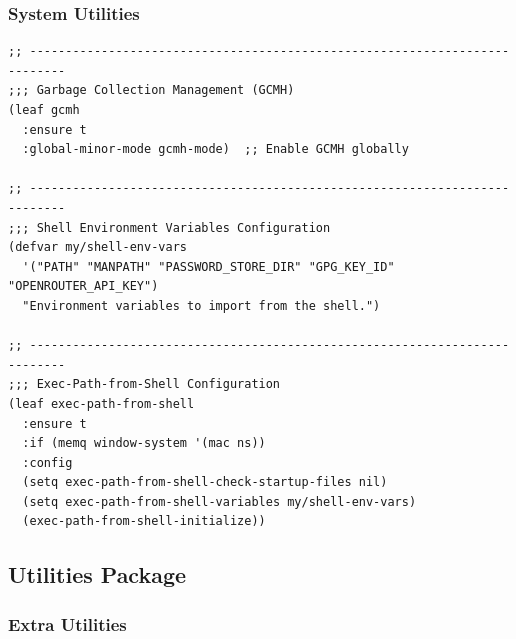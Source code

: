 \documentclass[11pt]{article}
\begin{document}
\subsubsection{System Utilities}
\label{sec:orgf99bebf}

\begin{verbatim}
;; ---------------------------------------------------------------------------
;;; Garbage Collection Management (GCMH)
(leaf gcmh
  :ensure t
  :global-minor-mode gcmh-mode)  ;; Enable GCMH globally

;; ---------------------------------------------------------------------------
;;; Shell Environment Variables Configuration
(defvar my/shell-env-vars
  '("PATH" "MANPATH" "PASSWORD_STORE_DIR" "GPG_KEY_ID" "OPENROUTER_API_KEY")
  "Environment variables to import from the shell.")

;; ---------------------------------------------------------------------------
;;; Exec-Path-from-Shell Configuration
(leaf exec-path-from-shell
  :ensure t
  :if (memq window-system '(mac ns))
  :config
  (setq exec-path-from-shell-check-startup-files nil)
  (setq exec-path-from-shell-variables my/shell-env-vars)
  (exec-path-from-shell-initialize))
\end{verbatim}
\subsection{Utilities Package}
\label{sec:orgb71e4b9}
\subsubsection{Extra Utilities}
\label{sec:org2914ffc}
\end{document}
